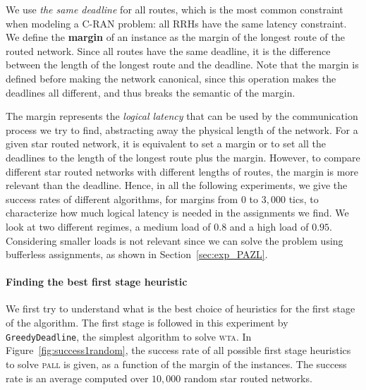 \documentclass[a4paper,10pt]{journal}
\newcommand\greedydeadline{\texttt{GreedyDeadline}\xspace}
\newcommand\pall{\textsc{pall}\xspace}
\newcommand\wta{\textsc{wta}\xspace}
\begin{document}
    We use \emph{the same deadline} for all routes, which is the most common constraint when modeling a C-RAN problem: all RRHs have the same latency constraint. We define the {\bf margin} of an instance as the margin of the longest route of the routed network. Since all routes have the same deadline, it is the difference between the length of the longest route and the deadline. Note that the margin is defined before making the network canonical, since this operation makes the deadlines all different, and thus breaks the semantic of the margin.

	The margin represents the \emph{logical latency} that can be used by the communication process we try to find, abstracting away the physical length of the network. For a given star routed network, it is equivalent to set a margin or to set all the deadlines to the length of the longest route plus the margin. However, to compare different star routed networks with different lengths of routes, the margin is more relevant than the deadline. Hence, in all the following experiments, we give the success rates of different algorithms, for margins from $0$ to $3,000$ tics, to characterize how much logical latency is needed in the assignments we find. We look at two different regimes, a medium load of $0.8$ and a high load of $0.95$. Considering smaller loads is not relevant since we can solve the problem using bufferless assignments, as shown in Section~\ref{sec:exp_PAZL}. 



    \paragraph{Finding the best first stage heuristic}
    
   
   	We first try to understand what is the best choice of heuristics for the first stage of the algorithm. The first stage is followed in this experiment by \greedydeadline, the simplest algorithm to solve \wta. In Figure~\ref{fig:success1random}, the success rate of all possible first stage heuristics to solve \pall is given, as a function of the margin of the instances. The success rate is an average computed over $10,000$ random star routed networks. 
   
\end{document}
